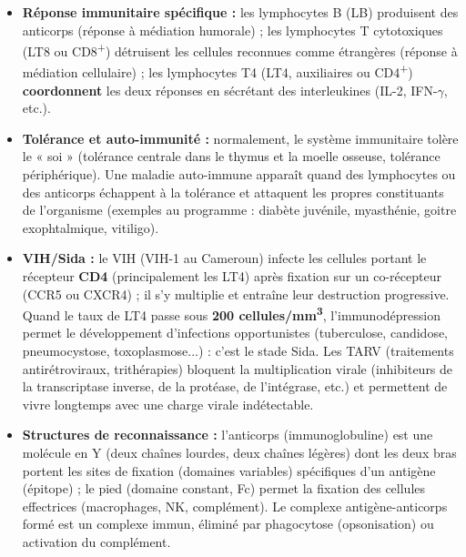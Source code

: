 \documentclass[11pt]{article}
\newcommand{\cle}[1]{{\popxbold\color{popdark}#1}}
\newcounter{popsec}
\newcounter{popsub}
\newcommand{\courssub}[1]{%
  \stepcounter{popsub}%
  \par\vspace{9pt}\noindent{\popxbold\fontsize{11.5}{13}\selectfont\color{popink}{\color{poporange}\thepopsec.\thepopsub}\hspace{6pt}#1}\par\nopagebreak\vspace{4pt}
}
\begin{document}
\courssub{Ressources à mobiliser}

\begin{aretenir}
\begin{itemize}
\item \textbf{Réponse immunitaire spécifique :} les lymphocytes B (LB) produisent des \cle{anticorps} (réponse à médiation humorale) ; les lymphocytes T cytotoxiques (LT8 ou CD8\textsuperscript{+}) détruisent les cellules reconnues comme étrangères (réponse à médiation cellulaire) ; les lymphocytes T4 (LT4, auxiliaires ou CD4\textsuperscript{+}) \textbf{coordonnent} les deux réponses en sécrétant des interleukines (IL-2, IFN-$\gamma$, etc.).
\item \textbf{Tolérance et auto-immunité :} normalement, le système immunitaire tolère le « soi » (tolérance centrale dans le thymus et la moelle osseuse, tolérance périphérique). Une \cle{maladie auto-immune} apparaît quand des lymphocytes ou des anticorps échappent à la tolérance et attaquent les propres constituants de l'organisme (exemples au programme : diabète juvénile, myasthénie, goitre exophtalmique, vitiligo).
\item \textbf{VIH/Sida :} le VIH (VIH-1 au Cameroun) infecte les cellules portant le récepteur \textbf{CD4} (principalement les LT4) après fixation sur un co-récepteur (CCR5 ou CXCR4) ; il s'y multiplie et entraîne leur destruction progressive. Quand le taux de LT4 passe sous \textbf{200 cellules/mm\textsuperscript{3}}, l'immunodépression permet le développement d'\cle{infections opportunistes} (tuberculose, candidose, pneumocystose, toxoplasmose...) : c'est le stade \cle{Sida}. Les \cle{TARV} (traitements antirétroviraux, trithérapies) bloquent la multiplication virale (inhibiteurs de la transcriptase inverse, de la protéase, de l'intégrase, etc.) et permettent de vivre longtemps avec une charge virale indétectable.
\item \textbf{Structures de reconnaissance :} l'anticorps (immunoglobuline) est une molécule en Y (deux chaînes lourdes, deux chaînes légères) dont les deux bras portent les \cle{sites de fixation} (domaines variables) spécifiques d'un \cle{antigène} (épitope) ; le pied (domaine constant, Fc) permet la fixation des cellules effectrices (macrophages, NK, complément). Le complexe antigène-anticorps formé est un \cle{complexe immun}, éliminé par phagocytose (opsonisation) ou activation du complément.
\end{itemize}
\end{aretenir}
\end{document}
